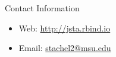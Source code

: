 \documentclass[final,hyperref={pdfpagelabels=false}]{beamer}
\begin{document}
\begin{frame}[t]
\begin{columns}[t]
\begin{column}{.465\textwidth}


\begin{block}{Contact Information}

\begin{itemize}
\item Web: \href{http://jsta.rbind.io}{http://jsta.rbind.io}
\item Email: \href{mailto:stachel2@msu.edu}{stachel2@msu.edu}
\end{itemize}

\end{block}


\end{column} %

\begin{column}{.015\textwidth}\end{column} %

\end{columns} %

\end{frame} %
\end{document}
